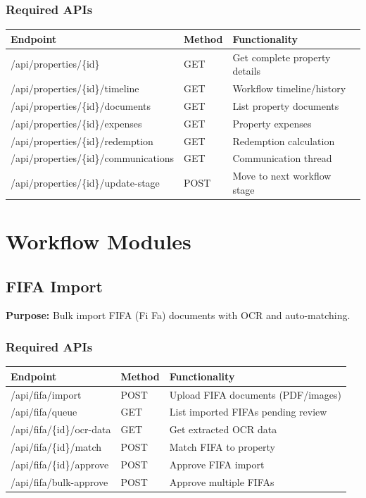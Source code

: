 \documentclass[11pt,a4paper]{article}
\begin{document}
\subsubsection{Required APIs}

\begin{longtable}{|p{5cm}|p{2cm}|p{6cm}|}
\hline
\textbf{Endpoint} & \textbf{Method} & \textbf{Functionality} \\
\hline
/api/properties/\{id\} & GET & Get complete property details \\
/api/properties/\{id\}/timeline & GET & Workflow timeline/history \\
/api/properties/\{id\}/documents & GET & List property documents \\
/api/properties/\{id\}/expenses & GET & Property expenses \\
/api/properties/\{id\}/redemption & GET & Redemption calculation \\
/api/properties/\{id\}/communications & GET & Communication thread \\
/api/properties/\{id\}/update-stage & POST & Move to next workflow stage \\
\hline
\end{longtable}

\newpage

\section{Workflow Modules}

\subsection{FIFA Import}

\textbf{Purpose:} Bulk import FIFA (Fi Fa) documents with OCR and auto-matching.

\subsubsection{Required APIs}

\begin{longtable}{|p{5cm}|p{2cm}|p{6cm}|}
\hline
\textbf{Endpoint} & \textbf{Method} & \textbf{Functionality} \\
\hline
/api/fifa/import & POST & Upload FIFA documents (PDF/images) \\
/api/fifa/queue & GET & List imported FIFAs pending review \\
/api/fifa/\{id\}/ocr-data & GET & Get extracted OCR data \\
/api/fifa/\{id\}/match & POST & Match FIFA to property \\
/api/fifa/\{id\}/approve & POST & Approve FIFA import \\
/api/fifa/bulk-approve & POST & Approve multiple FIFAs \\
\hline
\end{longtable}
\end{document}
